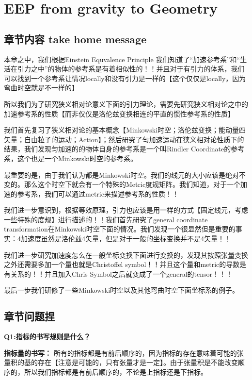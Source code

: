 
\section{EEP from gravity to Geometry}

\subsection{章节内容 take home message}
本章之中，我们根据Einstein Equvalence Principle 我们知道了“加速参考系”和“生活在引力之中”的物体的参考系是有着相似性的！！并且对于有引力的体系，我们可以找到一个参考系让情况locally和没有引力是一样的【这个仅仅是locally，因为弯曲时空就是不一样的】

所以我们为了研究狭义相对论意义下面的引力理论，需要先研究狭义相对论之中的加速参考系的性质【而非仅仅是洛伦兹变换相连的平直的惯性参考系的性质】

\bigskip
我们首先复习了狭义相对论的基本概念【Minkowski时空；洛伦兹变换；能动量四矢量；自由粒子的运动；Action】；然后研究了匀加速运动在狭义相对论性质下的结果，我们发现匀加速的的物体自身的参考系是一个叫Rindler Coordinate的参考系，这个也是一个Minkowski时空的参考系。

\bigskip
最重要的是，由于我们认为都是Minkowski时空。我们的线元的大小应该是绝对不变的。那么这个时空下就会有一个特殊的Metric度规矩阵。我们知道，对于一个加速的参考系，我们可以通过metric来描述参考系的性质！！

\bigskip
我们进一步意识到，根据等效原理，引力也应该是用一样的方式【固定线元，考虑一些特殊的度规】进行描述的！！我们首先研究了general coordinate transformation在Minkowski时空下面的情况。我们发现一个很显然但是重要的事实：4加速度虽然是洛伦兹4矢量，但是对于一般的坐标变换并不是4矢量！！

\bigskip
我们进一步研究加速度怎么在一般坐标变换下面进行变换的，发现其按照张量变换之外还需要多加一个量也就是Christoffel symbol！！并且这个量和metric的导数是有关系的！！并且加入Chris Symbol之后就变成了一个general的tensor！！！

\bigskip
最后一步我们研修了一些Minkowski时空以及其他弯曲时空下面坐标系的例子。


\subsection{章节问题捏}

\textbf{Q1:指标的书写规则是什么？}

\textbf{指标量的书写：}
所有的指标都是有前后顺序的，因为指标的存在意味着可能的张量积的基的存在【注意是可能的，只有张量才是一定】。由于张量积是不能改变顺序的，所以我们指标都是有前后顺序的，不论是上指标还是下指标。

